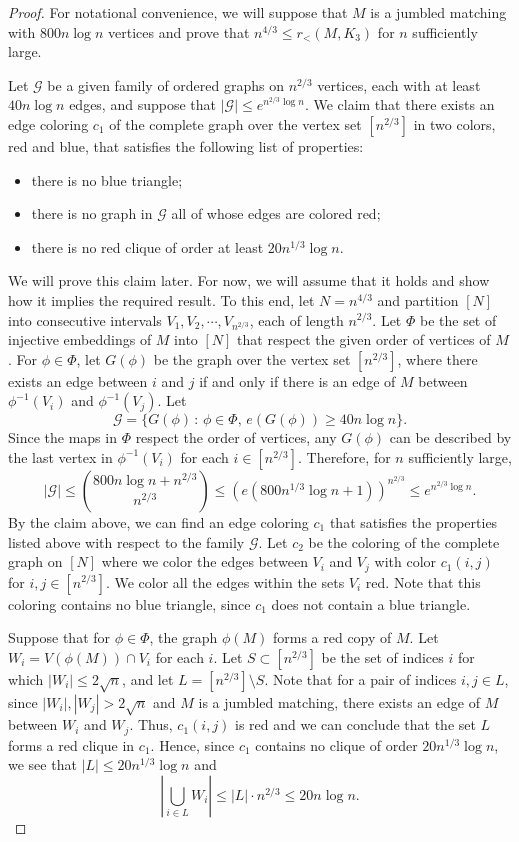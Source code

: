 \documentclass[11pt]{article}
\begin{document}
\begin{proof}
For notational convenience, we will suppose that
$M$ is a jumbled matching with $800n\log n$ vertices and prove that
$n^{4/3}\le r_{<}(M, K_3)$ for $n$ sufficiently large.

Let $\mathcal{G}$ be a given family of ordered graphs on $n^{2/3}$ vertices, each
with at least $40n\log n$ edges, and suppose that $|\mathcal{G}|\le e^{n^{2/3}\log n}$.
We claim that there exists an edge coloring $c_{1}$ of the complete graph
over the vertex set $[n^{2/3}]$ in two colors, red and blue, that satisfies the following list of properties:

\begin{itemize}
\item there is no blue triangle;
\item there is no graph in $\mathcal{G}$ all of whose edges are colored red;
\item there is no red clique of order at least $20n^{1/3}\log n$.
\end{itemize}

We will prove this claim later. For now, we will assume that it holds and show how it implies the required result.
To this end, let $N=n^{4/3}$ and partition $[N]$ into consecutive intervals $V_{1},V_{2},\cdots,V_{n^{2/3}}$, each
of length $n^{2/3}$. Let $\Phi$ be the set of injective
embeddings of $M$ into $[N]$ that respect the given order of vertices
of $M$. For $\phi \in \Phi$, let $G(\phi)$ be the graph over the
vertex set $[n^{2/3}]$, where there exists an edge between $i$ and
$j$ if and only if there is an edge of $M$ between $\phi^{-1}(V_{i})$
and $\phi^{-1}(V_{j})$. Let 
\[
\mathcal{G}=\{G(\phi)\,:\,\phi\in\Phi,\, e(G(\phi))\ge40n\log n\}.
\]
Since the maps in $\Phi$ respect the order of vertices, any $G(\phi)$
can be described by the last vertex in $\phi^{-1}(V_{i})$ for each
$i\in[n^{2/3}]$. Therefore, for $n$ sufficiently large,
\[
|\mathcal{G}|\le{800n\log n+n^{2/3} \choose n^{2/3}}\le\left(e(800n^{1/3}\log n+1)\right)^{n^{2/3}}\le e^{n^{2/3}\log n}.
\]
By the claim above, we can find an edge coloring $c_1$ 
that satisfies the properties listed above with respect to the family $\mathcal{G}$. 
Let $c_{2}$ be the coloring of the complete graph on $[N]$ where we color the edges between
$V_{i}$ and $V_{j}$ with color $c_{1}(i,j)$ for $i,j\in[n^{2/3}]$.
We color all the edges within the sets $V_{i}$ red. Note that this
coloring contains no blue triangle, since $c_{1}$ does not contain
a blue triangle.

Suppose that for $\phi\in\Phi$, the graph $\phi(M)$ forms a red
copy of $M$. Let $W_{i}=V(\phi(M))\cap V_{i}$ for each $i$. Let 
$S\subset[n^{2/3}]$ be the set of indices $i$ for which $|W_{i}|\le2 \sqrt{n}$,
and let $L=[n^{2/3}]\setminus S$. Note that for a pair of indices $i,j\in L$,
since $|W_{i}|,|W_{j}|> 2 \sqrt{n}$ and $M$ is a jumbled
matching, there exists an edge of $M$ between $W_{i}$ and $W_{j}$.
Thus, $c_{1}(i,j)$ is red and we can conclude that the set $L$ forms
a red clique in $c_{1}$. Hence, since $c_1$ contains no clique of order $20 n^{1/3} \log n$, we see that $|L|\le20n^{1/3}\log n$ and
\[
\left|\bigcup_{i\in L}W_{i}\right|\le|L|\cdot n^{2/3}\le20n\log n.
\]


\end{proof}
\end{document}
